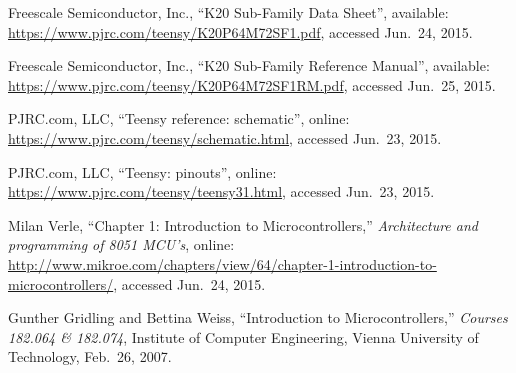 \documentclass[letterpaper, 11pt]{article}
\begin{document}
\begin{thebibliography}{9}

Freescale Semiconductor, Inc., ``K20 Sub-Family Data Sheet'', available: \url{https://www.pjrc.com/teensy/K20P64M72SF1.pdf}, accessed Jun.~24, 2015.

Freescale Semiconductor, Inc., ``K20 Sub-Family Reference Manual'', available: \url{https://www.pjrc.com/teensy/K20P64M72SF1RM.pdf}, accessed Jun.~25, 2015.

  PJRC.com, LLC, ``Teensy reference: schematic'', online: \url{https://www.pjrc.com/teensy/schematic.html}, accessed Jun.~23, 2015.

  PJRC.com, LLC, ``Teensy: pinouts'', online: \url{https://www.pjrc.com/teensy/teensy31.html}, accessed Jun.~23, 2015.

Milan Verle, ``Chapter 1: Introduction to Microcontrollers,'' \emph{Architecture and programming of 8051 MCU's}, online: \url{http://www.mikroe.com/chapters/view/64/chapter-1-introduction-to-microcontrollers/}, accessed Jun.~24, 2015.

Gunther Gridling and Bettina Weiss, ``Introduction to Microcontrollers,'' \emph{Courses 182.064 \& 182.074}, Institute of Computer Engineering, Vienna University of Technology, Feb.~26, 2007.


\end{thebibliography}
\end{document}
